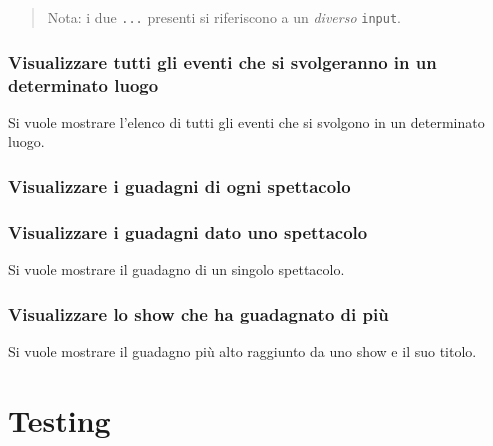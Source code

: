 \documentclass[a4paper,11pt]{article}
\begin{document}
\begin{quote}
  Nota: i due \texttt{...} presenti si riferiscono a un \emph{diverso} \texttt{input}.
\end{quote}

\subsubsection{Visualizzare tutti gli eventi che si svolgeranno in un determinato luogo}
Si vuole mostrare l'elenco di tutti gli eventi che si svolgono in un determinato luogo.


\subsubsection{Visualizzare i guadagni di ogni spettacolo}


\subsubsection{Visualizzare i guadagni dato uno spettacolo}
Si vuole mostrare il guadagno di un singolo spettacolo.


\subsubsection{Visualizzare lo show che ha guadagnato di più}
Si vuole mostrare il guadagno più alto raggiunto da uno show e il suo titolo.


\section{Testing}
\end{document}
